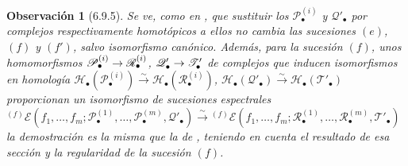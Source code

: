 \documentclass[10pt,oneside,openany]{book}
\theoremstyle{egaenv}\newtheorem*{env}{---}
\theoremstyle{egastatement}
\theoremstyle{egadescription}
\newtheorem*{remark}{Observación}
\renewcommand{\to}{\mathchoice{\longrightarrow}{\rightarrow}{\rightarrow}{\rightarrow}}
\begin{document}
\begin{remark}[6.9.5]
\label{III.6.9.5}
Se ve, como en , que sustituir los
$\mathscr P_\bullet^{(i)}$ y $\mathscr Q'_\bullet$ por complejos
respectivamente \emph{homotópicos} a ellos no cambia las sucesiones $(e)$, $(f)$ y
$(f')$, salvo isomorfismo canónico. Además, para la sucesión $(f)$, unos
homomorfismos
$\mathscr P_\bullet^{(i)}\to\mathscr R_\bullet^{(i)}$,
$\mathscr Q'_\bullet\to\mathscr T'_\bullet$ de complejos que inducen
isomorfismos en homología
$\mathscr H_\bullet(\mathscr P_\bullet^{(i)})\xrightarrow{\sim}
\mathscr H_\bullet(\mathscr R_\bullet^{(i)})$,
$\mathscr H_\bullet(\mathscr Q'_\bullet)\xrightarrow{\sim}
\mathscr H_\bullet(\mathscr T'_\bullet)$ proporcionan un isomorfismo de
sucesiones espectrales
${}^{(f)}\mathscr E
(f_1,\ldots,f_m;
\mathscr P_\bullet^{(1)},\ldots,\mathscr P_\bullet^{(m)},
\mathscr Q'_\bullet)
\xrightarrow{\sim}
{}^{(f)}\mathscr E
(f_1,\ldots,f_m;
\mathscr R_\bullet^{(1)},\ldots,\mathscr R_\bullet^{(m)},
\mathscr T'_\bullet)$
la demostración es la misma que la de , teniendo en cuenta
el resultado de esa sección y la regularidad de la sucesión $(f)$.
\end{remark}
\end{document}
